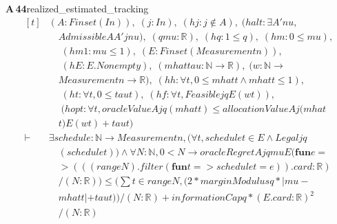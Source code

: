 \documentclass[conference]{IEEEtran}
\theoremstyle{definition}
\newcommand{\lean}[1]{\textsf{\footnotesize #1}}
\begin{document}
\noindent\textbf{A\,44}\quad\lean{realized\_estimated\_tracking}
{\footnotesize\[ \begin{aligned}[t]
&(\mathit{A} : \mathit{Finset} (\mathit{I} \mathit{n})),\; (\mathit{j} : \mathit{I} \mathit{n}),\; (\mathit{hj} : \mathit{j} \notin \mathit{A}),\; (\mathit{halt} : \exists \mathit{A'} \mathit{nu},\\
&\quad \mathit{Admissible} \mathit{A} \mathit{A'} \mathit{j} \mathit{nu}),\; (\mathit{q} \mathit{mu} : \mathbb{R} ),\; (\mathit{hq} : 1 \leq \mathit{q}),\; (\mathit{hm} : 0 \leq \mathit{mu}),\\
&\quad \; (\mathit{hm1} : \mathit{mu} \leq 1),\; (\mathit{E} : \mathit{Finset} (\mathit{Measurement} \mathit{n})),\\
&\quad \; (\mathit{hE} : \mathit{E}.\mathit{Nonempty}),\; (\mathit{mhat} \mathit{tau} : \mathbb{N} \to \mathbb{R} ),\; (\mathit{w} : \mathbb{N} \to\\
&\quad \mathit{Measurement} \mathit{n} \to \mathbb{R} ),\; (\mathit{hh} : \forall \mathit{t},0 \leq \mathit{mhat} \mathit{t} \wedge \mathit{mhat} \mathit{t} \leq 1),\\
&\quad \; (\mathit{ht} : \forall \mathit{t},0 \leq \mathit{tau} \mathit{t}),\; (\mathit{hf} : \forall \mathit{t},\mathit{Feasible} \mathit{j} \mathit{q} \mathit{E} (\mathit{w} \mathit{t})),\\
&\quad \; (\mathit{hopt} : \forall \mathit{t},\mathit{oracleValue} \mathit{A} \mathit{j} \mathit{q} (\mathit{mhat} \mathit{t}) \leq \mathit{allocationValue} \mathit{A} \mathit{j} (\mathit{mhat}\\
&\quad \mathit{t}) \mathit{E} (\mathit{w} \mathit{t})+\mathit{tau} \mathit{t})\\
\vdash\;&\exists \mathit{schedule} : \mathbb{N} \to \mathit{Measurement} \mathit{n}, (\forall \mathit{t},\mathit{schedule} \mathit{t} \in \mathit{E} \wedge \mathit{Legal} \mathit{j} \mathit{q}\\
&\quad (\mathit{schedule} \mathit{t})) \wedge \forall \mathit{N} : \mathbb{N} ,0 < \mathit{N} \to \mathit{oracleRegret} \mathit{A} \mathit{j} \mathit{q} \mathit{mu} \mathit{E} (\mathbf{fun} \mathit{e} =\\
&\quad > (((\mathit{range} \mathit{N}).\mathit{filter} (\mathbf{fun} \mathit{t} => \mathit{schedule} \mathit{t}=\mathit{e})).\mathit{card}:\mathbb{R} )\\
&\quad /(\mathit{N}:\mathbb{R} )) \leq (\textstyle\sum \mathit{t} \in \mathit{range} \mathit{N},(2*\mathit{marginModulus} \mathit{q}*|\mathit{mu}-\\
&\quad \mathit{mhat} \mathit{t}|+\mathit{tau} \mathit{t}))/(\mathit{N}:\mathbb{R} ) +\mathit{informationCap} \mathit{q}*(\mathit{E}.\mathit{card}:\mathbb{R} )^{2}\\
&\quad /(\mathit{N}:\mathbb{R} )
\end{aligned} \]}
\end{document}
